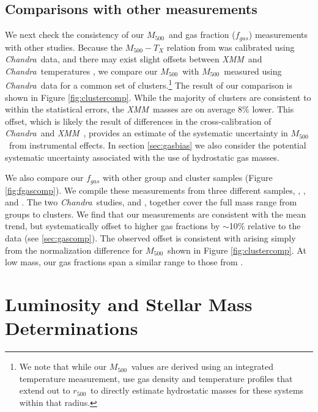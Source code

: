 \documentclass[preprint]{emulateapj}
\newcommand\rfive{$r_{500}$}
\newcommand\mfive{${M}_{500}$}
\newcommand{\xmm}{\textit{XMM}}
\newcommand{\chandra}{\textit{Chandra}}
\begin{document}
\subsection{Comparisons with other measurements}
\label{subsec:gascomp}
We next check the consistency of our \mfive\ and gas fraction
($f_{gas}$) measurements with other studies.  Because the
$M_{500}-T_X$ relation from \citet{vikhlinin2009} was calibrated using
\chandra\ data, and there may exist slight offsets between \xmm\ and
\chandra\ temperatures \citep{nevalainen2010}, we compare our \mfive\
with \mfive\ measured using \chandra\ data\citep{vikhlinin2006} for a
common set of clusters.{\footnote{ We note that while our \mfive\
    values are derived using an integrated temperature measurement,
    \citet{vikhlinin2006} use gas density and temperature profiles
    that extend out to \rfive\ to directly estimate hydrostatic masses
    for these systems within that radius.}}  The result of our
comparison is shown in Figure \ref{fig:clustercomp}.  While the
majority of clusters are consistent to within the statistical errors,
the \xmm\ masses are on average 8\% lower.  This offset, which is
likely the result of differences in the cross-calibration of \chandra\
and \xmm\ \citep{nevalainen2010}, provides an estimate of the
systematic uncertainty in \mfive\ from instrumental effects.
In section \ref{sec:gasbias} we also consider the potential systematic uncertainty
associated with the use of hydrostatic gas masses.

We also compare our $f_{gas}$ with other group and cluster samples
(Figure \ref{fig:fgascomp}). We compile these measurements from three
different samples, \citet{vikhlinin2006}, \citet{sun2009}, and
\citet{sanderson2013}. The two \chandra\ studies, \citep{sun2009} and
\citet{vikhlinin2006}, together cover the full mass range from groups
to clusters.  We find that our measurements are consistent with the
mean trend, but systematically offset to higher gas fractions by
$\sim$10\% relative to the \citet{vikhlinin2006} data (see
\ref{sec:gascomp}).  The observed offset is consistent with arising
simply from the normalization difference for \mfive\ shown in Figure
\ref{fig:clustercomp}. At low mass, our gas fractions span a similar
range to those from \citet{sun2009}.



\section{Luminosity and Stellar Mass Determinations}
\label{sec:stars}
\end{document}
